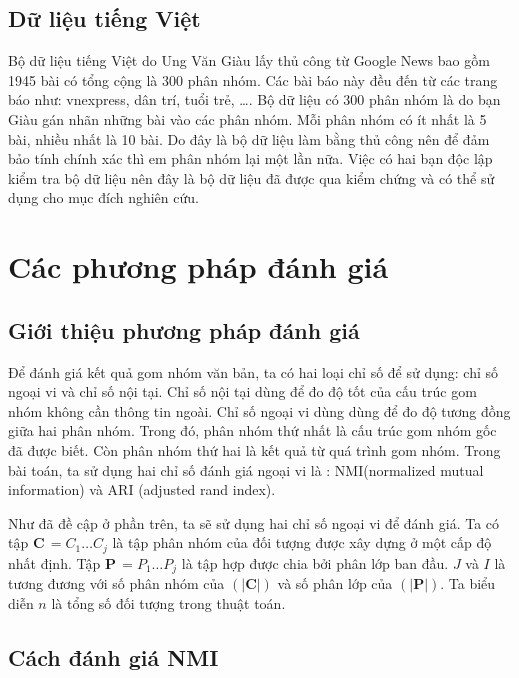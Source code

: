 \subsection{Dữ liệu tiếng Việt}
Bộ dữ liệu tiếng Việt do Ung Văn Giàu lấy thủ công từ Google News bao gồm 1945 bài có tổng cộng là 300 phân nhóm.
Các bài báo này đều đến từ các trang báo như: vnexpress, dân trí, tuổi trẻ, \ldots.
Bộ dữ liệu có 300 phân nhóm là do bạn Giàu gán nhãn những bài vào các phân nhóm.
Mỗi phân nhóm có ít nhất là 5 bài, nhiều nhất là 10 bài.
Do đây là bộ dữ liệu làm bằng thủ công nên để đảm bảo tính chính xác thì em phân nhóm lại một lần nữa. 
Việc có hai bạn độc lập kiểm tra bộ dữ liệu nên đây là bộ dữ liệu đã được qua kiểm chứng và có thể sử dụng cho mục đích nghiên cứu.



\section{Các phương pháp đánh giá}

	\subsection{Giới thiệu phương pháp đánh giá}
	Để đánh giá kết quả gom nhóm văn bản, ta có hai loại chỉ số để sử dụng: chỉ số ngoại vi và chỉ số nội tại.
	Chỉ số nội tại dùng để đo độ tốt của cấu trúc gom nhóm không cần thông tin ngoài.
	Chỉ số ngoại vi dùng dùng để đo độ tương đồng giữa hai phân nhóm.
	Trong đó, phân nhóm thứ nhất là cấu trúc gom nhóm gốc đã được biết.
	Còn phân nhóm thứ hai là kết quả từ quá trình gom nhóm.
	Trong bài toán, ta sử dụng hai chỉ số đánh giá ngoại vi là : NMI(normalized mutual information) và ARI (adjusted rand index).
	
	Như đã đề cập ở phần trên, ta sẽ sử dụng hai chỉ số ngoại vi để đánh giá.
	Ta có tập $\textbf{C} \, = {C_1 \ldots C_j}$ là tập phân nhóm của đối tượng được xây dựng ở một cấp độ nhất định.
	Tập $\textbf{P} \, = {P_1 \ldots P_j}$ là tập hợp được chia bởi phân lớp ban đầu. $J$ và $I$ là tương đương với số phân nhóm của $(|\textbf{C}|)$ và số phân lớp của  $(|\textbf{P}|)$.
	Ta biểu diễn $n$ là tổng số đối tượng trong thuật toán.

	\subsection{Cách đánh giá NMI}
